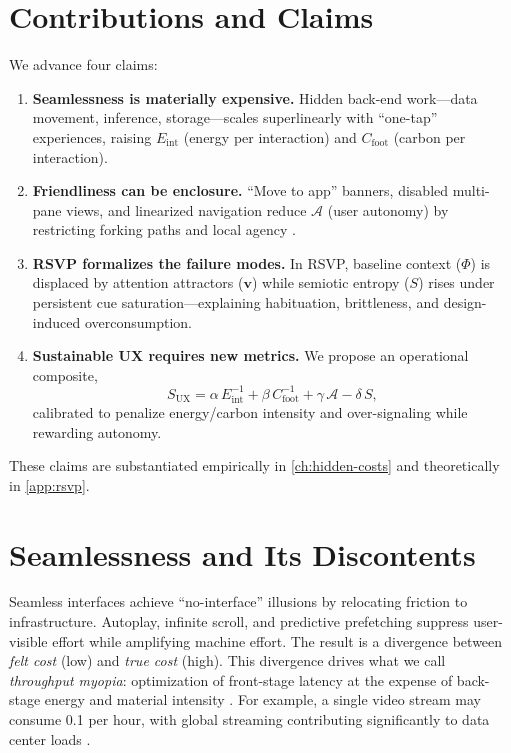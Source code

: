 \documentclass[openany]{book}
\newcommand{\PhiS}{\Phi} %
\newcommand{\vvec}{\mathbf{v}} %
\newcommand{\Sent}{S} %
\newcommand{\Eint}{E_{\mathrm{int}}} %
\newcommand{\Cfoot}{C_{\mathrm{foot}}} %
\newcommand{\Auton}{\mathcal{A}} %
\newcommand{\SUX}{S_{\mathrm{UX}}} %
\newcommand{\kWh}{\mathrm{kWh}}
\begin{document}
\section{Contributions and Claims}
\label{sec:intro-claims}
We advance four claims:
\begin{enumerate}[label=\textbf{C\arabic*}.]
  \item \textbf{Seamlessness is materially expensive.} Hidden back-end work—data movement, inference, storage—scales superlinearly with \enquote{one-tap} experiences, raising $\Eint$ (energy per interaction) and $\Cfoot$ (carbon per interaction).
  \item \textbf{Friendliness can be enclosure.} \enquote{Move to app} banners, disabled multi-pane views, and linearized navigation reduce $\Auton$ (user autonomy) by restricting forking paths and local agency \citep{doctorow2022}.
  \item \textbf{RSVP formalizes the failure modes.} In RSVP, baseline context (\(\PhiS\)) is displaced by attention attractors (\(\vvec\)) while semiotic entropy (\(\Sent\)) rises under persistent cue saturation—explaining habituation, brittleness, and design-induced overconsumption.
  \item \textbf{Sustainable UX requires new metrics.} We propose an operational composite,
  \begin{equation}
  \label{eq:intro-SUX}
  \SUX = \alpha\,\Eint^{-1} + \beta\,\Cfoot^{-1} + \gamma\,\Auton - \delta\,\Sent,
  \end{equation}
  calibrated to penalize energy/carbon intensity and over-signaling while rewarding autonomy.
\end{enumerate}
These claims are substantiated empirically in \cref{ch:hidden-costs} and theoretically in \cref{app:rsvp}.

\section{Seamlessness and Its Discontents}
\label{sec:intro-seamless}
Seamless interfaces achieve \enquote{no-interface} illusions by relocating friction to infrastructure. Autoplay, infinite scroll, and predictive prefetching suppress user-visible effort while amplifying machine effort. The result is a divergence between \emph{felt cost} (low) and \emph{true cost} (high). This divergence drives what we call \emph{throughput myopia}: optimization of front-stage latency at the expense of back-stage energy and material intensity \citep{norman1988,colak2024,designlab2024}. For example, a single video stream may consume \SI{0.1}{\kWh} per hour, with global streaming contributing significantly to data center loads \citep{extentia2024}.
\end{document}
